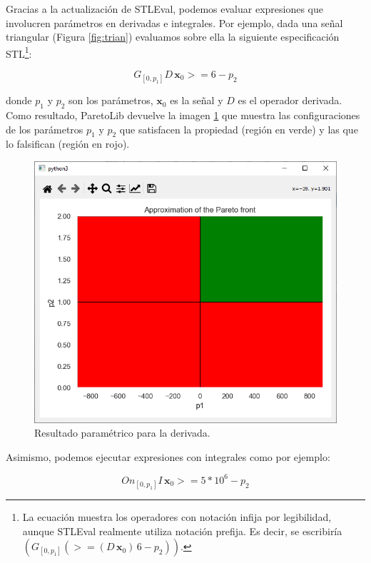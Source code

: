 Gracias a la actualización de STLEval, podemos evaluar expresiones que involucren parámetros en derivadas e integrales. Por ejemplo, dada una señal triangular (Figura \ref{fig:trian}) evaluamos sobre ella la siguiente especificación STL\footnote{La ecuación muestra los operadores con notación infija por legibilidad, aunque STLEval realmente utiliza notación prefija. Es decir, se escribiría $(G_{[0,p_1]} (>= (D\, \mathbf{x}_0) \, 6 - p_2))$.}:


$$G_{[0,p_1]} D\, \mathbf{x}_0 >= 6 - p_2$$ 

donde $p_1$ y $p_2$ son los parámetros, $\mathbf{x}_0$ es la señal y $D$ es el operador derivada.
Como resultado, ParetoLib devuelve la imagen \ref{fig:param_derivative} que muestra las configuraciones de los parámetros $p_1$ y $p_2$ que satisfacen la propiedad (región en verde) y las que lo falsifican (región en rojo). %

\begin{figure}[htb]
\centering
  \includegraphics[width=0.7\linewidth]{images/stl_parametrico_der} 
\caption{Resultado paramétrico para la derivada.}
\label{fig:param_derivative}
\end{figure}


Asimismo, podemos ejecutar expresiones con integrales como por ejemplo:

$$On_{[0,p_1]} I\, \mathbf{x}_0 >= 5*10^6 - p_2$$ 

